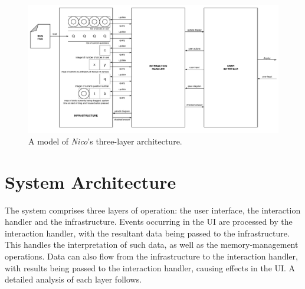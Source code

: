 \documentclass[12pt,twoside,notitlepage,xetex]{report}
\begin{document}
\newpage
\begin{landscape}
\begin{center}
\begin{figure}[H]
\begin{center}
\includegraphics[height=\textheight-2cm]{figs/nico_arch_new.pdf}
\end{center}
\caption{A model of \emph{Nico}'s three-layer architecture.}
\label{fig:NicoArch}
\end{figure}
\end{center}
\end{landscape}

\newpage
\section{System Architecture}

The system comprises three layers of operation: the user interface, the interaction handler and the infrastructure.  Events occurring in the UI are processed by the interaction handler, with the resultant data being passed to the infrastructure.  This handles the interpretation of such data, as well as the memory-management operations.  Data can also flow from the infrastructure to the interaction handler, with results being passed to the interaction handler, causing effects in the UI.  A detailed analysis of each layer follows.

\end{document}
